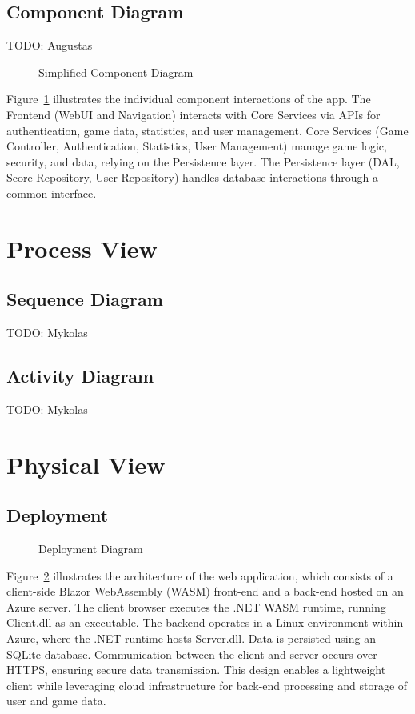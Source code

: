 \documentclass[11pt,a4paper]{article}
\newcommand{\inputdiagram}[1]{}
\newcommand{\textwidthdiagram}[2][1]{%
  \resizebox{#1\textwidth}{!}{\inputdiagram{#2}}%
}
\begin{document}
\subsection{Component Diagram}
TODO: Augustas
\begin{figure}[H]
    \centering
    \textwidthdiagram{components_simplified_diagram.tex}
    \caption{Simplified Component Diagram}
    \label{fig:simp_component_diagram}
\end{figure}

Figure~\ref{fig:simp_component_diagram} illustrates the individual component interactions of the app. The Frontend (WebUI and Navigation) interacts with Core Services via APIs for authentication, game data, statistics, and user management. Core Services (Game Controller, Authentication, Statistics, User Management) manage game logic, security, and data, relying on the Persistence layer. The Persistence layer (DAL, Score Repository, User Repository) handles database interactions through a common interface.

\section{Process View}

\subsection{Sequence Diagram}
TODO: Mykolas
\subsection{Activity Diagram}
TODO: Mykolas

\section{Physical View}
\subsection{Deployment}
\begin{figure}[H]
    \centering
    \textwidthdiagram[0.8]{deployment_diagram.tex}
    \caption{Deployment Diagram}
    \label{fig:deployment_diagram}
\end{figure}

Figure~\ref{fig:deployment_diagram} illustrates the architecture of the web application,
which consists of a client-side Blazor WebAssembly (WASM) front-end and a back-end hosted on an Azure server. The client browser executes the .NET WASM
runtime, running Client.dll as an executable. The backend operates in a Linux
environment within Azure, where the .NET runtime hosts Server.dll. Data is
persisted using an SQLite database. Communication between the client and
server occurs over HTTPS, ensuring secure data transmission. This design
enables a lightweight client while leveraging cloud infrastructure for
back-end processing and storage of user and game data.
\end{document}
